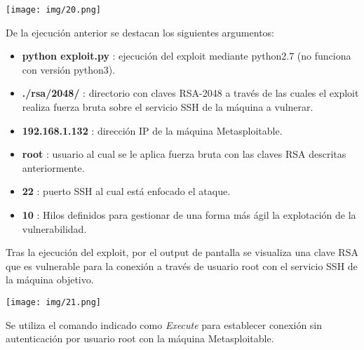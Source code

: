\documentclass[12pt,oneside,a4paper]{book}
\begin{document}
\begin{enumerate}
\vspace{1em}

\begin{center}
    \texttt{[image: img/20.png]}
\end{center}

\vspace{1em}

\hspace{20pt}
De la ejecución anterior se destacan los siguientes argumentos:

\vspace{1em}

\begin{itemize}
	\item \textbf{python exploit.py} : ejecución del exploit mediante python2.7 (no funciona con versión python3).
	\item \textbf{./rsa/2048/} : directorio con claves RSA-2048 a través de las cuales el exploit realiza fuerza bruta sobre el servicio SSH de la máquina a vulnerar.
	\item \textbf{192.168.1.132} : dirección IP de la máquina Metasploitable.
	\item \textbf{root} : usuario al cual se le aplica fuerza bruta con las claves RSA descritas anteriormente.
	\item \textbf{22} : puerto SSH al cual está enfocado el ataque.
	\item \textbf{10} : Hilos definidos para gestionar de una forma más ágil la explotación de la vulnerabilidad.
\end{itemize}

\vspace{1em}

\hspace{20pt}
Tras la ejecución del exploit, por el output de pantalla se visualiza una clave RSA que es vulnerable para la conexión a través de usuario root con el servicio SSH de la máquina objetivo. 

\vspace{1em}

\begin{center}
    \texttt{[image: img/21.png]}
\end{center}

\vspace{1em}

\hspace{20pt}
Se utiliza el comando indicado como \textit{Execute} para establecer conexión sin autenticación por usuario root con la máquina Metasploitable. 


\end{enumerate}
\end{document}
